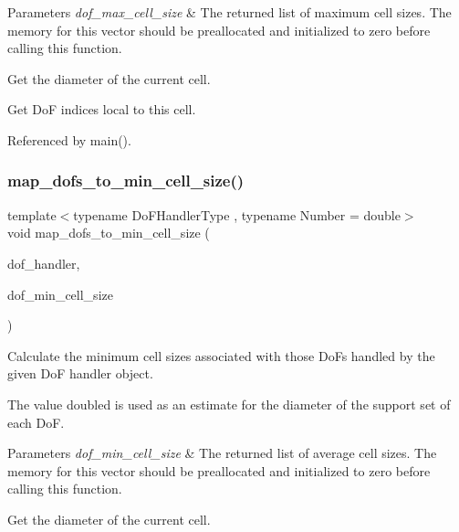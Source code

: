 \begin{DoxyParams}{Parameters}
{\em dof\+\_\+max\+\_\+cell\+\_\+size} & The returned list of maximum cell sizes. The memory for this vector should be preallocated and initialized to zero before calling this function. \\
\hline
\end{DoxyParams}
Get the diameter of the current cell.

Get DoF indices local to this cell.

Referenced by main().

\mbox{\label{group__hierarchical__matrices_ga0a1c7de8480c4e9b4a002818f8c19b52}} 
\subsubsection{\texorpdfstring{map\+\_\+dofs\+\_\+to\+\_\+min\+\_\+cell\+\_\+size()}{map\_dofs\_to\_min\_cell\_size()}}
{\footnotesize\ttfamily template$<$typename Do\+F\+Handler\+Type , typename Number  = double$>$ \\
void map\+\_\+dofs\+\_\+to\+\_\+min\+\_\+cell\+\_\+size (\begin{DoxyParamCaption}\item[{const Do\+F\+Handler\+Type \&}]{dof\+\_\+handler,  }\item[{std\+::vector$<$ Number $>$ \&}]{dof\+\_\+min\+\_\+cell\+\_\+size }\end{DoxyParamCaption})}

Calculate the minimum cell sizes associated with those Do\+Fs handled by the given DoF handler object.

The value doubled is used as an estimate for the diameter of the support set of each DoF.


\begin{DoxyParams}{Parameters}
{\em dof\+\_\+min\+\_\+cell\+\_\+size} & The returned list of average cell sizes. The memory for this vector should be preallocated and initialized to zero before calling this function. \\
\hline
\end{DoxyParams}
Get the diameter of the current cell.

